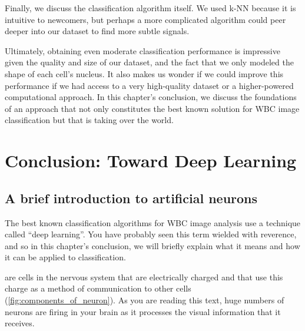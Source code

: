 \begin{qbox}\end{qbox}

Finally, we discuss the classification algorithm itself. We used k-NN because it is intuitive to newcomers, but perhaps a more complicated algorithm could peer deeper into our dataset to find more subtle signals.

Ultimately, obtaining even moderate classification performance is impressive given the quality and size of our dataset, and the fact that we only modeled the shape of each cell's nucleus. It also makes us wonder if we could improve this performance if we had access to a very high-quality dataset or a higher-powered computational approach. In this chapter's conclusion, we discuss the foundations of an approach that not only constitutes the best known solution for WBC image classification but that is taking over the world.\\

\FloatBarrier
{}
\section{Conclusion: Toward Deep Learning}
\label{sec:conclusion}

\subsection{A brief introduction to artificial neurons}

The best known classification algorithms for WBC image analysis use a technique called ``deep learning''. You have probably seen this term wielded with reverence, and so in this chapter's conclusion, we will briefly explain what it means and how it can be applied to classification.

 are cells in the nervous system that are electrically charged and that use this charge as a method of communication to other cells (\autoref{fig:components_of_neuron}). As you are reading this text, huge numbers of neurons are firing in your brain as it processes the visual information that it receives.\\

